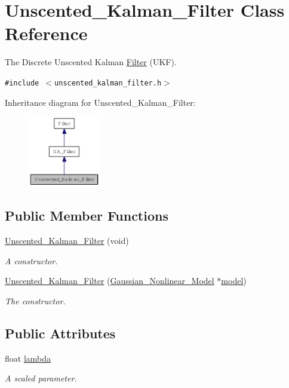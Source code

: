 \hypertarget{class_unscented___kalman___filter}{
\section{Unscented\_\-Kalman\_\-Filter Class Reference}
\label{class_unscented___kalman___filter}
}
The Discrete Unscented Kalman \hyperlink{class_filter}{Filter} (UKF).  


{\tt \#include $<$unscented\_\-kalman\_\-filter.h$>$}

Inheritance diagram for Unscented\_\-Kalman\_\-Filter:\nopagebreak
\begin{figure}[H]
\begin{center}
\leavevmode
\includegraphics[width=89pt]{class_unscented___kalman___filter__inherit__graph}
\end{center}
\end{figure}
\subsection*{Public Member Functions}
\begin{CompactItemize}
\item 
\hyperlink{class_unscented___kalman___filter_9604c9cbd68ec0ba603964f2677c7e2e}{Unscented\_\-Kalman\_\-Filter} (void)
\begin{CompactList}\small\item\em A constructor. \item\end{CompactList}\item 
\hyperlink{class_unscented___kalman___filter_b1095ded70883e7a2389fd925fe1e378}{Unscented\_\-Kalman\_\-Filter} (\hyperlink{class_gaussian___nonlinear___model}{Gaussian\_\-Nonlinear\_\-Model} $\ast$\hyperlink{class_filter_2173d25727b871e9b9d0b6f588ba3cd2}{model})
\begin{CompactList}\small\item\em The constructor. \item\end{CompactList}\end{CompactItemize}
\subsection*{Public Attributes}
\begin{CompactItemize}
\item 
float \hyperlink{class_unscented___kalman___filter_a160d1820d77b547fee70f25747db2cb}{lambda}
\begin{CompactList}\small\item\em A scaled parameter. \item\end{CompactList}\end{CompactItemize}
